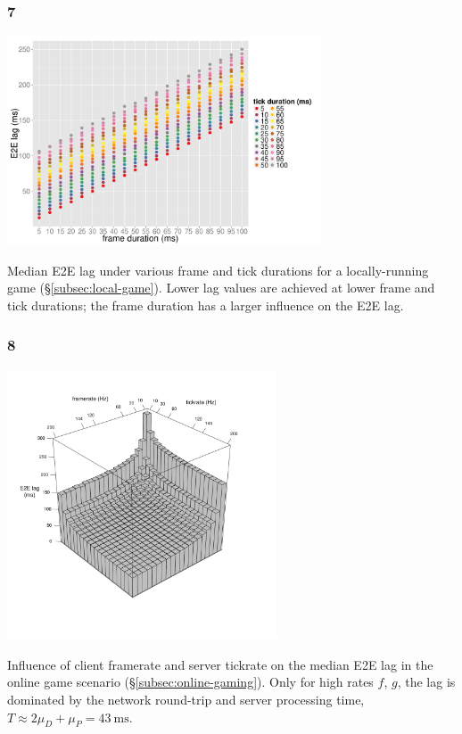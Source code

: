 \documentclass{UDEbeamerEN}
\begin{document}
\begin{frame}
	\frametitle{7}

	\begin{center}
		\includegraphics[width=0.7\textwidth]{../../../simulation/visualization/nwless-onlinegame-1000rounds.pdf}

		Median \gls{E2E} lag under various frame and tick durations for a locally-running game (§\ref{subsec:local-game}). Lower lag values are achieved at lower frame and tick durations; the frame duration has a larger influence on the \gls{E2E} lag.
	\end{center}
\end{frame}


\begin{frame}
	\frametitle{8}

	\begin{center}
		\vspace{-9mm}
		\includegraphics[width=0.6\textwidth]{../../../simulation/visualization/e2e-lag-3dbars.pdf}
		\vspace{-10mm}

		Influence of client framerate and server tickrate on the median \gls{E2E} lag in the online game scenario (§\ref{subsec:online-gaming}). Only for high rates $f$, $g$, the lag is dominated by the network round-trip and server processing time, $T\approx2\mu_D+\mu_P=\SI{43}{\milli\second}$.
	\end{center}

\end{frame}
\end{document}
